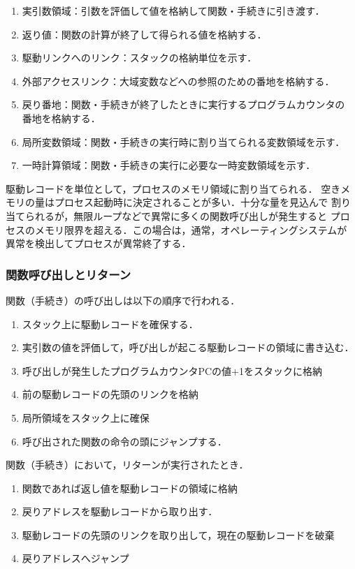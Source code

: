\documentclass[dvipdfmx,a4j]{jbook}
\begin{document}
\begin{enumerate}
\item 実引数領域：引数を評価して値を格納して関数・手続きに引き渡す．
\item 返り値：関数の計算が終了して得られる値を格納する．
\item 駆動リンクへのリンク：スタックの格納単位を示す．
\item 外部アクセスリンク：大域変数などへの参照のための番地を格納する．
\item 戻り番地：関数・手続きが終了したときに実行するプログラムカウンタの
番地を格納する．
\item 局所変数領域：関数・手続きの実行時に割り当てられる変数領域を示す．
\item 一時計算領域：関数・手続きの実行に必要な一時変数領域を示す．
\end{enumerate}

駆動レコードを単位として，プロセスのメモリ領域に割り当てられる．
空きメモリの量はプロセス起動時に決定されることが多い．十分な量を見込んで
割り当てられるが，無限ループなどで異常に多くの関数呼び出しが発生すると
プロセスのメモリ限界を超える．この場合は，通常，オペレーティングシステムが
異常を検出してプロセスが異常終了する．

\subsubsection{関数呼び出しとリターン}

関数（手続き）の呼び出しは以下の順序で行われる．
\begin{enumerate}
  \item スタック上に駆動レコードを確保する．
  \item 実引数の値を評価して，呼び出しが起こる駆動レコードの領域に書き込む．
  \item 呼び出しが発生したプログラムカウンタPCの値+1をスタックに格納
  \item 前の駆動レコードの先頭のリンクを格納
  \item 局所領域をスタック上に確保
  \item 呼び出された関数の命令の頭にジャンプする．
\end{enumerate}

関数（手続き）において，リターンが実行されたとき．
\begin{enumerate}
  \item 関数であれば返し値を駆動レコードの領域に格納
  \item 戻りアドレスを駆動レコードから取り出す．
  \item 駆動レコードの先頭のリンクを取り出して，現在の駆動レコードを破棄
  \item 戻りアドレスへジャンプ
\end{enumerate}
\end{document}
